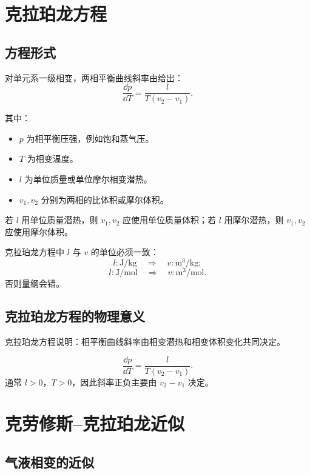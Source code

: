 \section{克拉珀龙方程}

\subsection{方程形式}

对单元系一级相变，两相平衡曲线斜率由给出：
\[
  \boxed{
  \frac{\dd p}{\dd T}
  =
  \frac{l}{T(v_2-v_1)}
  }.
\]

其中：
\begin{itemize}
  \item \(p\) 为相平衡压强，例如饱和蒸气压。
  \item \(T\) 为相变温度。
  \item \(l\) 为单位质量或单位摩尔相变潜热。
  \item \(v_1,v_2\) 分别为两相的比体积或摩尔体积。
\end{itemize}

若 \(l\) 用单位质量潜热，则 \(v_1,v_2\) 应使用单位质量体积；若 \(l\) 用摩尔潜热，则 \(v_1,v_2\) 应使用摩尔体积。

\begin{WarnBox}[单位必须配套]
克拉珀龙方程中 \(l\) 与 \(v\) 的单位必须一致：
\[
  l:\mathrm{J/kg}
  \quad\Rightarrow\quad
  v:\mathrm{m^3/kg};
\]
\[
  l:\mathrm{J/mol}
  \quad\Rightarrow\quad
  v:\mathrm{m^3/mol}.
\]
否则量纲会错。
\end{WarnBox}

\subsection{克拉珀龙方程的物理意义}

克拉珀龙方程说明：相平衡曲线斜率由相变潜热和相变体积变化共同决定。

\begin{KeyBox}[斜率判断]
\[
  \frac{\dd p}{\dd T}
  =
  \frac{l}{T(v_2-v_1)}.
\]
通常 \(l>0\)，\(T>0\)，因此斜率正负主要由 \(v_2-v_1\) 决定。
\end{KeyBox}

\section{克劳修斯--克拉珀龙近似}

\subsection{气液相变的近似}

